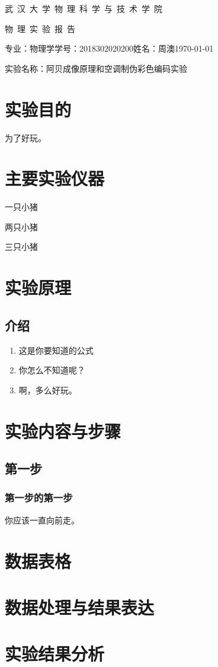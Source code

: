 \documentclass{whureport}
\newcommand{\major}{物理学}
\newcommand{\name}{周澳}
\newcommand{\stuid}{2018302020200}
\newcommand{\newdate}{\today}
\newcommand{\newtitle}{阿贝成像原理和空调制伪彩色编码实验}
\begin{document}

\begin{center}
  \begin{spacing}{2}
    { \kaishu 武\ 汉\ 大\ 学\ 物\ 理\ 科\ 学\ 与\ 技\ 术\ 学\ 院}
  \end{spacing}
  \begin{spacing}{1.5}
    {\kaishu 物\ 理\ 实\ 验\ 报\ 告}

    专业：\major \quad 学号：\stuid \quad 姓名：\name \quad \newdate
  \end{spacing}
  实验名称：\newtitle
\end{center}



\section{实验目的}
为了好玩。

\section{主要实验仪器}
  \begin{clause}
    \item 一只小猪
    \item 两只小猪
    \item 三只小猪
  \end{clause}

\section{实验原理}
  \subsection{介绍}
    \begin{enumerate}
      \item 这是你要知道的公式
      \item 你怎么不知道呢？
      \item 啊，多么好玩。
    \end{enumerate}

\section{实验内容与步骤}
  \subsection{第一步}
    \subsubsection{第一步的第一步}
    你应该一直向前走。

\section{数据表格}

\section{数据处理与结果表达}

\section{实验结果分析}
\end{document}

